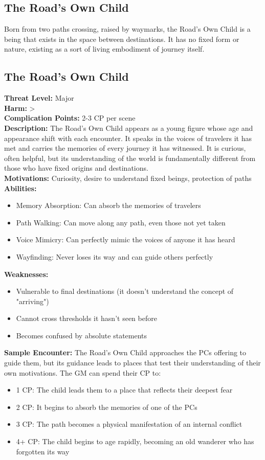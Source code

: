 \documentclass[11pt]{article}
\newenvironment{monsterentry}[1]{%
  \begin{mdframed}[backgroundcolor=shadecolor, linewidth=0pt, leftmargin=0pt, rightmargin=0pt]%
  \subsection*{#1}%
}{%
  \end{mdframed}%
}
\begin{document}
\subsection{The Road's Own Child}

Born from two paths crossing, raised by waymarks, the Road's Own Child is a being that exists in the space between destinations. It has no fixed form or nature, existing as a sort of living embodiment of journey itself.

\begin{monsterentry}{The Road's Own Child}
\textbf{Threat Level:} Major \\
\textbf{Harm:} \textgreater \\
\textbf{Complication Points:} 2-3 CP per scene \\
\textbf{Description:} The Road's Own Child appears as a young figure whose age and appearance shift with each encounter. It speaks in the voices of travelers it has met and carries the memories of every journey it has witnessed. It is curious, often helpful, but its understanding of the world is fundamentally different from those who have fixed origins and destinations. \\
\textbf{Motivations:} Curiosity, desire to understand fixed beings, protection of paths \\
\textbf{Abilities:}
\begin{itemize}
    \item Memory Absorption: Can absorb the memories of travelers
    \item Path Walking: Can move along any path, even those not yet taken
    \item Voice Mimicry: Can perfectly mimic the voices of anyone it has heard
    \item Wayfinding: Never loses its way and can guide others perfectly
\end{itemize}
\textbf{Weaknesses:}
\begin{itemize}
    \item Vulnerable to final destinations (it doesn't understand the concept of "arriving")
    \item Cannot cross thresholds it hasn't seen before
    \item Becomes confused by absolute statements
\end{itemize}
\textbf{Sample Encounter:} The Road's Own Child approaches the PCs offering to guide them, but its guidance leads to places that test their understanding of their own motivations. The GM can spend their CP to:
\begin{itemize}
    \item 1 CP: The child leads them to a place that reflects their deepest fear
    \item 2 CP: It begins to absorb the memories of one of the PCs
    \item 3 CP: The path becomes a physical manifestation of an internal conflict
    \item 4+ CP: The child begins to age rapidly, becoming an old wanderer who has forgotten its way
\end{itemize}
\end{monsterentry}
\end{document}
